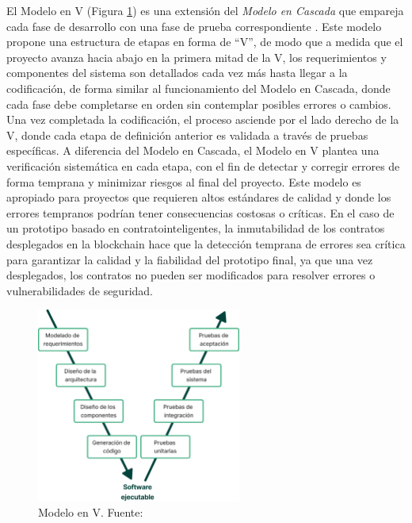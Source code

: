 El Modelo en V (Figura \ref{fig:model-v}) es una extensión del \textit{Modelo en Cascada} que empareja cada fase de desarrollo con una fase de prueba correspondiente \cite{pressman2010ingenieria}. Este modelo propone una estructura de etapas en forma de ``V'', de modo que a medida que el proyecto avanza hacia abajo en la primera mitad de la V, los requerimientos y componentes del sistema son detallados cada vez más hasta llegar a la codificación, de forma similar al funcionamiento del Modelo en Cascada, donde cada fase debe completarse en orden sin contemplar posibles errores o cambios. Una vez completada la codificación, el proceso asciende por el lado derecho de la V, donde cada etapa de definición anterior es validada a través de pruebas específicas. A diferencia del Modelo en Cascada, el Modelo en V plantea una verificación sistemática en cada etapa, con el fin de detectar y corregir errores de forma temprana y minimizar riesgos al final del proyecto. Este modelo es apropiado para proyectos que requieren altos estándares de calidad y donde los errores tempranos podrían tener consecuencias costosas o críticas. En el caso de un prototipo basado en \glspl{contratointeligente}, la inmutabilidad de los contratos desplegados en la blockchain hace que la detección temprana de errores sea crítica para garantizar la calidad y la fiabilidad del prototipo final, ya que una vez desplegados, los contratos no pueden ser modificados para resolver errores o vulnerabilidades de seguridad.

\begin{figure}[!tb]
	\centering
	\includegraphics[width=0.6\textwidth]{Figures/model-v.png}
	\caption[Modelo en V]{Modelo en V. Fuente: \cite{pressman2010ingenieria}}
    \label{fig:model-v}
\end{figure}

